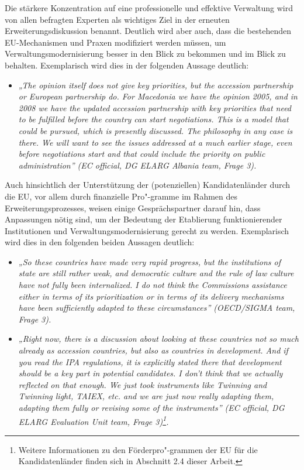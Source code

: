 Die stärkere Konzentration auf eine professionelle und effektive Verwaltung wird von allen befragten Experten als wichtiges Ziel in der erneuten Erweiterungsdiskussion benannt. Deutlich wird aber auch, dass die bestehenden EU-Mechanismen und Praxen modifiziert werden müssen, um Verwaltungsmodernisierung besser in den Blick zu bekommen und im Blick zu behalten. Exemplarisch wird dies in der folgenden Aussage deutlich: 
\begin{itemize}[label={}]
\item \textit{„The opinion itself does not give key priorities, but the accession partnership or European partnership do. For Macedonia we have the opinion 2005, and in 2008 we have the updated accession partnership with key priorities that need to be fulfilled before the country can start negotiations. This is a model that could be pursued, which is presently discussed. The philosophy in any case is there. We will want to see the issues addressed at a much earlier stage, even before negotiations start and that could include the priority on public administration” (EC official, DG ELARG Albania team, Frage 3). }\end{itemize}
Auch hinsichtlich der Unterstützung der (potenziellen) Kandidatenländer durch die EU, vor allem durch finanzielle Pro"-gramme im Rahmen des Erweiterungsprozesses, weisen einige Gesprächspartner darauf hin, dass Anpassungen nötig sind, um der Bedeutung der Etablierung funktionierender Institutionen und Verwaltungsmodernisierung gerecht zu werden. Exemplarisch wird dies in den folgenden beiden Aussagen deutlich:
\begin{itemize}[label={}]
\item \textit{„So these countries have made very rapid progress, but the institutions of state are still rather weak, and democratic culture and the rule of law culture have not fully been internalized. I do not think the Commissions assistance either in terms of its prioritization or in terms of its delivery mechanisms have been sufficiently adapted to these circumstances” (OECD/SIGMA team, Frage 3).}
\item \textit{„Right now, there is a discussion about looking at these countries not so much already as accession countries, but also as countries in development. And if you read the IPA regulations, it is explicitly stated there that development should be a key part in potential candidates. I don’t think that we actually reflected on that enough. We just took instruments like Twinning and Twinning light, TAIEX, etc. and we are just now really adapting them, adapting them fully or revising some of the instruments” (EC official, DG ELARG Evaluation Unit team, Frage 3)\footnote{Weitere Informationen zu den Förderpro"-grammen der EU für die Kandidatenländer finden sich in Abschnitt 2.4 dieser Arbeit.}.} 
\end{itemize}

